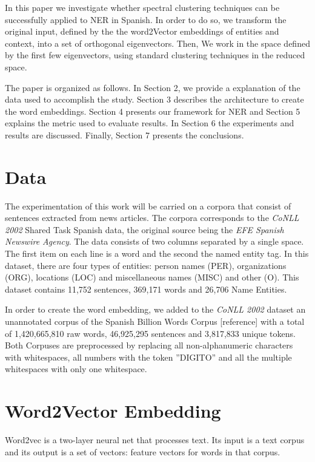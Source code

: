 \documentclass[]{article}
\begin{document}
	In this paper we investigate whether spectral clustering techniques can be successfully applied to NER in Spanish. In order to do so, we transform the original input, defined by the the word2Vector embeddings of entities and context, into a set of orthogonal eigenvectors. Then, We work in the space defined by the first few eigenvectors, using standard clustering techniques in the reduced space.
	
	The paper is organized as follows. In Section 2, we provide a explanation of the data used to accomplish the study. Section 3 describes the architecture to create the word embeddings. Section 4 presents our framework for NER and Section 5 explains the metric used to evaluate results. In Section 6 the experiments and results are discussed.  Finally, Section 7 presents the conclusions.
	
	\section{Data}
	The experimentation of this work will be carried on a corpora that consist of sentences extracted from news articles. The corpora corresponds to the \emph{CoNLL 2002} Shared Task Spanish data, the original source being the \emph{EFE Spanish Newswire Agency}.  The data consists of two columns separated by a single space. The first item on each line is a word and the second the named entity tag. In this dataset, there are four types of entities: person names (PER), organizations (ORG), locations (LOC) and miscellaneous names (MISC) and other (O). This dataset contains 11,752 sentences, 369,171 words and 26,706 Name Entities.  
	
	In order to create the word embedding, we added to the \emph{CoNLL 2002} dataset an unannotated corpus of the Spanish Billion Words Corpus [reference] with a total of 1,420,665,810 raw words,  46,925,295 sentences and 3,817,833 unique tokens. Both Corpuses are preprocessed by replacing all non-alphanumeric characters with whitespaces, all numbers with the token ''DIGITO'' and all the multiple whitespaces with only one whitespace.
	
	
	
	\section{Word2Vector Embedding}
	
	Word2vec is a two-layer neural net that processes text. Its input is a text corpus and its output is a set of vectors: feature vectors for words in that corpus. 
	
\end{document}
